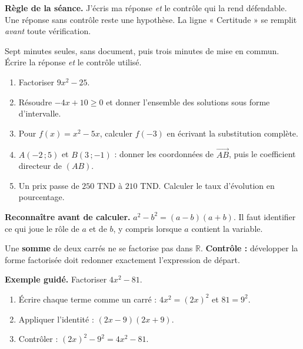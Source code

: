 \documentclass[10pt,a4paper]{article}
\begin{document}
\begin{graybox}\small\textbf{Règle de la séance.} J'écris ma réponse \emph{et} le contrôle qui la rend défendable. Une réponse sans contrôle reste une hypothèse. La ligne « Certitude » se remplit \emph{avant} toute vérification.\end{graybox}
\par\vspace{2mm}
Sept minutes seules, sans document, puis trois minutes de mise en commun. Écrire la réponse \emph{et} le contrôle utilisé.
\begin{enumerate}
\item Factoriser $9x^2 - 25$.
\item Résoudre $-4x + 10 \ge 0$ et donner l'ensemble des solutions sous forme d'intervalle.
\item Pour $f(x)=x^2-5x$, calculer $f(-3)$ en écrivant la substitution complète.
\item $A(-2\,;5)$ et $B(3\,;-1)$ : donner les coordonnées de $\vec{AB}$, puis le coefficient directeur de $(AB)$.
\item Un prix passe de $250$ TND à $210$ TND. Calculer le taux d'évolution en pourcentage.
\end{enumerate}
\certline
\aideline
\needspace{62mm}\par\vspace{3mm}
\begin{methodbox}
\textbf{Reconnaître avant de calculer.} $a^2 - b^2 = (a - b)(a + b)$. Il faut identifier ce qui joue le rôle
de $a$ et de $b$, y compris lorsque $a$ contient la variable.
\par\smallskip
Une \textbf{somme} de deux carrés ne se factorise pas dans $\mathbb{R}$.
\textbf{Contrôle :} développer la forme factorisée doit redonner exactement l'expression de départ.
\end{methodbox}
\begin{graybox}
\textbf{Exemple guidé.} Factoriser $4x^2 - 81$.
\begin{enumerate}
\item Écrire chaque terme comme un carré : $4x^2 = (2x)^2$ et $81 = 9^2$.
\item Appliquer l'identité : $(2x - 9)(2x + 9)$.
\item Contrôler : $(2x)^2 - 9^2 = 4x^2 - 81$.
\end{enumerate}
\end{graybox}
\end{document}
